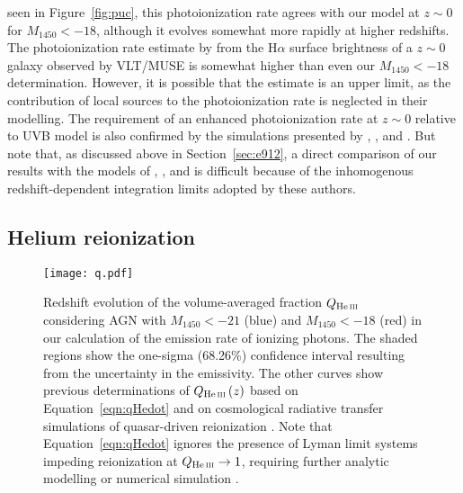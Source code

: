 \documentclass[fleqn,usenatbib]{mnras}
\begin{document}
seen in Figure~\ref{fig:puc}, this photoionization rate agrees with
our model at $z\sim 0$ for $M_{1450}<-18$, although it evolves
somewhat more rapidly at higher redshifts.  The photoionization rate
estimate by \citet{2017MNRAS.467.4802F} from the H$\alpha$ surface
brightness of a $z\sim 0$ galaxy observed by VLT/MUSE is somewhat
higher than even our $M_{1450}<-18$ determination.  However, it is
possible that the \citet{2017MNRAS.467.4802F} estimate is an upper
limit, as the contribution of local sources to the photoionization
rate is neglected in their modelling.  The requirement of an enhanced
photoionization rate at $z\sim 0$ relative to
\citet{2012ApJ...746..125H} UVB model is also confirmed by the
simulations presented by \citet{2017MNRAS.467L..86V},
\citet{2017ApJ...837..106O}, and \citet{2018arXiv180104931P}.  But
note that, as discussed above in Section~\ref{sec:e912}, a direct
comparison of our results with the models of
\citet{2015ApJ...813L...8M}, \citet{2015MNRAS.451L..30K}, and
\citet{2018arXiv180104931P} is difficult because of the inhomogenous
redshift-dependent integration limits adopted by these authors.

\subsection{Helium reionization}

\begin{figure}
  \begin{center}
    \texttt{[image: q.pdf]}
  \end{center}
  \caption{
  Redshift evolution of the volume-averaged  fraction $Q_\ion{He}{iii}$
  considering AGN with $M_{1450}<-21$ (blue) and $M_{1450}<-18$ (red)
  in our calculation of the emission rate of ionizing photons.
  The shaded regions show the one-sigma (68.26\%) confidence interval
  resulting from the uncertainty in the emissivity.
  The other curves show previous determinations of $Q_\ion{He}{iii}\left(z\right)$
  based on Equation~\eqref{eqn:qHedot}
  \citep{2012ApJ...746..125H, 2015ApJ...813L...8M, 2016ApJ...828...90L, 2018arXiv180104931P}
  and on cosmological radiative transfer simulations of quasar-driven  reionization
  \citep{2009ApJ...694..842M, 2014MNRAS.445.4186C}.
  Note that Equation~\eqref{eqn:qHedot} ignores the presence of 
  Lyman limit systems impeding reionization at  $Q_\ion{He}{iii}\rightarrow 1$,
  requiring further analytic modelling \citep{2017ApJ...851...50M} or
  numerical simulation \citep{2018arXiv180104931P}.
  \label{fig:qhe}}  
\end{figure}
\end{document}
